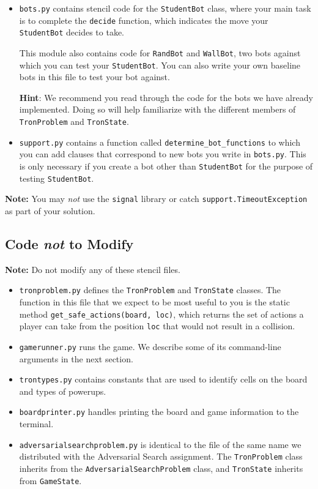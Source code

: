 \documentclass{article}
\begin{document}
\begin{itemize}
\item \texttt{bots.py} contains stencil code for the \texttt{StudentBot} class,
  where your main task is to complete the \texttt{decide} function,
  which indicates the move your \texttt{StudentBot} decides to take.

  This module also contains code for \texttt{RandBot} and
  \texttt{WallBot}, two bots against which you can test your
  \texttt{StudentBot}.  You can also write your own baseline bots in
  this file to test your bot against.
  
  \textbf{Hint}: We recommend you read through the code for the bots
  we have already implemented.  Doing so will help familiarize with
  the different members of \texttt{TronProblem} and \texttt{TronState}.

\item \texttt{support.py} contains a function called
  \texttt{determine\_bot\_functions} to which you can add clauses that
  correspond to new bots you write in \texttt{bots.py}.  This is only
  necessary if you create a bot other than \texttt{StudentBot} for the
  purpose of testing \texttt{StudentBot}.
\end{itemize}

\noindent
\textbf{Note:} You may \textit{not\/} use the \texttt{signal} library
or catch \texttt{support.TimeoutException} as part of your solution.


\subsection{Code \emph{not\/} to Modify}
\textbf{Note:} Do not modify any of these stencil files.

\begin{itemize}
\item \texttt{tronproblem.py} defines the \texttt{TronProblem} and \texttt{TronState} classes.
%
  The function in this file that we expect to be most useful to you
  is the static method \texttt{get\_safe\_actions(board, loc)}, which
  returns the set of actions a player can take from the position
  \texttt{loc} that would not result in a collision.

\item \texttt{gamerunner.py} runs the game.  We describe some of its
  command-line arguments in the next section.

\item \texttt{trontypes.py} contains constants that are used to
  identify cells on the board and types of powerups.

\item \texttt{boardprinter.py} handles printing the board and game
  information to the terminal.

\item \texttt{adversarialsearchproblem.py} is identical to the file of
  the same name we distributed with the Adversarial Search assignment.
  The \texttt{TronProblem} class inherits from the
  \texttt{AdversarialSearchProblem} class, and \texttt{TronState}
  inherits from \texttt{GameState}.
\end{itemize}
\end{document}
